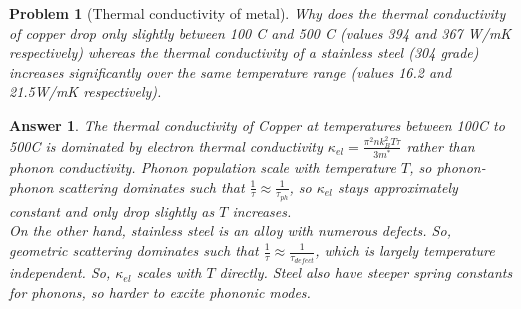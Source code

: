 \documentclass[a4paper]{article}
\newtheorem{ans}{Answer}[section]
\theoremstyle{new}
\newtheorem{qns}{Problem}[section]
\begin{document}
\newpage
\begin{qns}[Thermal conductivity of metal]
Why does the thermal conductivity of copper drop only slightly between 100 \degree C and 500 \degree C (values 394 and 367 W/mK respectively) whereas the thermal conductivity of a stainless steel (304 grade) increases significantly over the same temperature range (values 16.2 and 21.5W/mK respectively).
\end{qns}
\begin{ans}
The thermal conductivity of Copper at temperatures between 100\degree C to 500\degree C is dominated by electron thermal conductivity $\kappa_{el}=\frac{\pi^2nk_B^2T\tau}{3m^*}$ rather than phonon conductivity. Phonon population scale with temperature $T$, so phonon-phonon scattering dominates such that $\frac{1}{\tau}\approx\frac{1}{\tau_{ph}}$, so $\kappa_{el}$ stays approximately constant and only drop slightly as $T$ increases.\\[5pt]
On the other hand, stainless steel is an alloy with numerous defects. So, geometric scattering dominates such that $\frac{1}{\tau}\approx\frac{1}{\tau_{defect}}$, which is largely temperature independent. So, $\kappa_{el}$ scales with $T$ directly. Steel also have steeper spring constants for phonons, so harder to excite phononic modes.
\end{ans}
\end{document}
